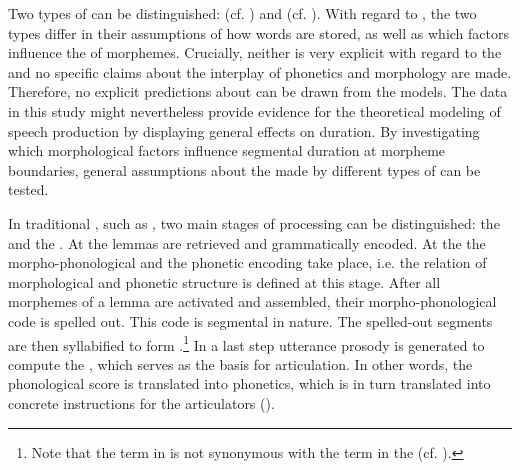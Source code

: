 {{ Two types of   can be distinguished:  (cf. \citealt{Levelt.1999,Levelt.1999b,Levelt.2000}) and  (cf. \citealt{Johnson.1997b,Bybee.2002,Pierrehumbert.2001,Pierrehumbert.2002}). With regard to , the two types differ in their assumptions of how words are stored, as well as which factors influence the  of morphemes. Crucially, neither is very explicit with regard to the  and no specific claims about the interplay of phonetics and morphology are made. Therefore, no explicit predictions about  can be drawn from the models. The data in this study might nevertheless provide evidence for the theoretical modeling of  speech production by displaying general effects on duration. By investigating which morphological factors influence segmental duration at morpheme boundaries, general assumptions about the  made by different types of  can be tested.

In traditional , such as  \cite{Levelt.1999b}, two main stages of processing can be distinguished: the  and the . At the  lemmas are retrieved and grammatically encoded. At the  the morpho-phonological and the phonetic encoding take place, i.e. the relation of morphological and phonetic structure is defined at this stage. After all morphemes of a lemma are activated and assembled, their morpho-phonological code is spelled out. This code is segmental in nature. The spelled-out segments are then syllabified to form .\footnote{Note that the term  in \cite{Levelt.1999b} is not synonymous with the term in the  (cf. ). } In a last step utterance prosody is generated to compute the , which serves as the basis for articulation. In other words, the phonological score is translated into phonetics, which is in turn translated into concrete instructions for the articulators ().

}}
